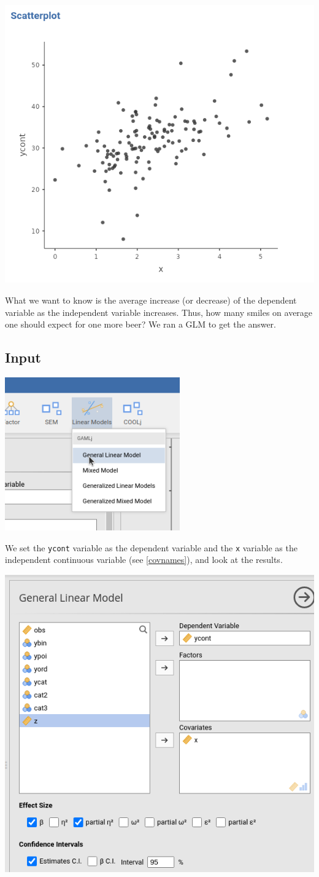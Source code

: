 \documentclass[
]{book}
\begin{document}
\includegraphics[width=0.8\linewidth]{bookletpics/2_scatterplot1}

What we want to know is the average increase (or decrease) of the dependent variable as the independent variable increases. Thus, how many smiles on average one should expect for one more beer? We ran a GLM to get the answer.

\hypertarget{glminput}{%
\subsection{Input}\label{glminput}}

\includegraphics[width=0.5\linewidth]{bookletpics/2_menu1}

We set the \texttt{ycont} variable as the dependent variable and the \texttt{x} variable as the independent continuous variable (see \ref{covnames}), and look at the results.

\includegraphics[width=0.7\linewidth]{bookletpics/2_input1}
\end{document}
